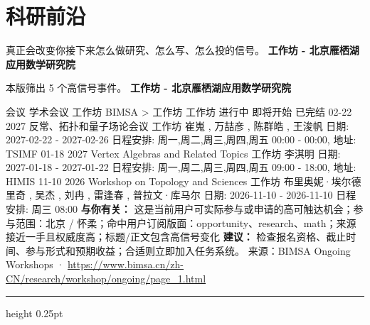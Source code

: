 \documentclass[10.5pt]{ctexart}
\begin{document}
\section*{科研前沿}
{\color{ormuted} 真正会改变你接下来怎么做研究、怎么写、怎么投的信号。}
\vspace{2mm}
{\LARGE\bfseries 工作坊 - 北京雁栖湖应用数学研究院}\par
\vspace{1mm}
{\color{ormuted} 本版筛出 5 个高信号事件。}
\vspace{3mm}
{\Large\bfseries 工作坊 - 北京雁栖湖应用数学研究院}\par
会议 学术会议 工作坊 BIMSA > 工作坊 工作坊 进行中 即将开始 已完结 02-22 2027 反常、拓扑和量子场论会议 工作坊 崔嵬 , 万喆彦 , 陈群皓 , 王浚帆 日期: 2027-02-22 - 2027-02-26 日程安排: 周一,周二,周三,周四,周五 00:00 - 00:00, 地址: TSIMF 01-18 2027 Vertex Algebras and Related Topics 工作坊 李淇明 日期: 2027-01-18 - 2027-01-22 日程安排: 周一,周二,周三,周四,周五 09:00 - 18:00, 地址: HIMIS 11-10 2026 Workshop on Topology and Sciences 工作坊 布里奥妮·埃尔德里奇 , 吴杰 , 刘冉 , 雷逢春 , 普拉文·库马尔 日期: 2026-11-10 - 2026-11-10 日程安排: 周三 08:00
\textbf{与你有关：} 这是当前用户可实际参与或申请的高可触达机会；参与范围：北京 / 怀柔；命中用户订阅版面：opportunity、research、math；来源接近一手且权威度高；标题/正文包含高信号变化
\textbf{建议：} 检查报名资格、截止时间、参与形式和预期收益；合适则立即加入任务系统。
{\footnotesize\color{ormuted} 来源：BIMSA Ongoing Workshops · \url{https://www.bimsa.cn/zh-CN/research/workshop/ongoing/page_1.html}}
\vspace{4mm}
\hrule height 0.25pt
\vspace{3mm}
\end{document}
